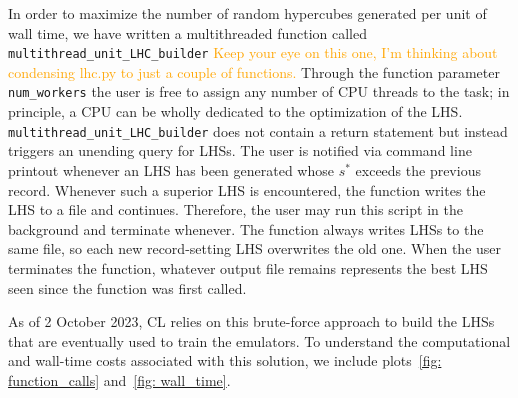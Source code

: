 In order to maximize the number of random hypercubes generated per unit of
wall time, we have written a multithreaded function called
\verb|multithread_unit_LHC_builder| \textcolor{orange}{Keep your eye on this
one, I'm thinking about condensing lhc.py to just a couple of functions.}
Through the function parameter \verb|num_workers| the user is free to assign
any number of CPU threads to the task; in principle, a CPU can be
wholly dedicated to the optimization of the LHS.
\verb|multithread_unit_LHC_builder| does not contain a return statement but
instead triggers an unending query for LHSs. The user is notified via command
line printout whenever an LHS has been generated whose $s^*$ exceeds
the previous record. Whenever such a superior LHS is
encountered, the function writes the LHS to a file and continues. Therefore,
the user may run this script in the background and terminate whenever. The
function always writes LHSs to the same file, so each new record-setting LHS
overwrites the old one. When the user terminates the function, whatever output
file remains represents the best LHS seen since the function was first called.

\begin{comment}
The \verb|cdist| function can be re-used to compare LHSs loaded from 
different
files. However, since there is generally little reason to keep old LHSs
(except, perhaps, to reconstruct specific emulators), it reduces clutter to
simply continue overwriting the same file. Therefore, the function
\verb|multithread_unit_LHC_builder| also includes a parameter
\verb|previous_record|, which is recommended whenever the user would like to
stop the function and then resume it later. In such a case, the parameter
should be set to the \verb|cdist| value of the exis}
\end{comment}



As of 2 October 2023, CL relies on this brute-force approach to build the
LHSs that are eventually used to train the emulators. To understand the 
computational and wall-time costs associated with this solution, we include 
plots~\ref{fig: function_calls} and~\ref{fig: wall_time}.

